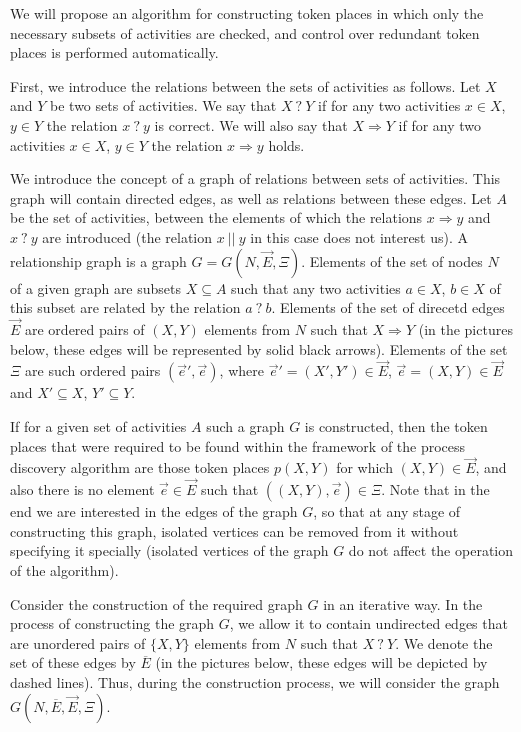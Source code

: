 \documentclass[
11pt,%
tightenlines,%
twoside,%
onecolumn,%
nofloats,%
nobibnotes,%
nofootinbib,%
superscriptaddress,%
noshowpacs,%
centertags]%
{revtex4}
\begin{document}
We will propose an algorithm for constructing token places in which only the necessary subsets of activities are checked, and control over redundant token places is performed automatically.

First, we introduce the relations between the sets of activities as follows.
Let $X$ and $Y$ be two sets of activities.
We say that $X \ ? \ Y$ if for any two activities $x \in X$, $y \in Y$ the relation $x \ ? \ y$ is correct.
We will also say that $X \Rightarrow Y$ if for any two activities $x \in X$, $y \in Y$ the relation $x \Rightarrow y$ holds.

We introduce the concept of a graph of relations between sets of activities.
This graph will contain directed edges, as well as relations between these edges.
Let $A$ be the set of activities, between the elements of which the relations $x \Rightarrow y$ and $x \ ? \ y$ are introduced (the relation $x \ || \ y$ in this case does not interest us).
A relationship graph is a graph $G = G(N, \overrightarrow{E}, \Xi)$.
Elements of the set of nodes $N$ of a given graph are subsets $X \subseteq A$ such that any two activities $a \in X$, $b \in X$ of this subset are related by the relation $a \ ? \ b$.
Elements of the set of direcetd edges $\overrightarrow {E}$ are ordered pairs of $(X, Y)$ elements from $N$ such that $X \Rightarrow Y$ (in the pictures below, these edges will be represented by solid black arrows).
Elements of the set $\Xi$ are such ordered pairs $(\overrightarrow{e}', \overrightarrow{e})$, where $\overrightarrow {e}' = (X ', Y') \in \overrightarrow{E}$, $\overrightarrow{e} = (X, Y) \in \overrightarrow{E}$ and $X' \subseteq X$, $Y' \subseteq Y$.    

If for a given set of activities $A$ such a graph $G$ is constructed, then the token places that were required to be found within the framework of the process discovery algorithm are those token places $p(X, Y)$ for which $(X, Y) \in \overrightarrow {E}$, and also there is no element $\overrightarrow{e} \in \overrightarrow {E}$ such that $((X, Y), \overrightarrow {e}) \in \Xi $.
Note that in the end we are interested in the edges of the graph $G$, so that at any stage of constructing this graph, isolated vertices can be removed from it without specifying it specially (isolated vertices of the graph $G$ do not affect the operation of the algorithm).

Consider the construction of the required graph $G$ in an iterative way.
In the process of constructing the graph $G$, we allow it to contain undirected edges that are unordered pairs of $\{X, Y\}$ elements from $N$ such that $X \ ? \ Y$.
We denote the set of these edges by $\overline{E}$ (in the pictures below, these edges will be depicted by dashed lines).
Thus, during the construction process, we will consider the graph $G(N, \overline{E}, \overrightarrow{E}, \Xi)$.
\end{document}
